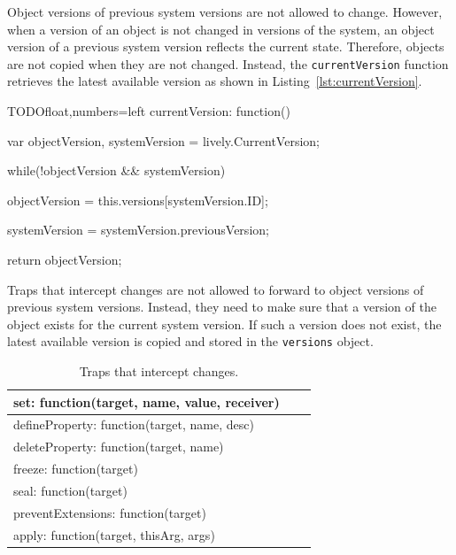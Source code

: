 Object versions of previous system versions are not allowed to change.
However, when a version of an object is not changed in versions of the system, an object version of a previous system version reflects the current state.
Therefore, objects are not copied when they are not changed.
Instead, the \lstinline{currentVersion} function retrieves the latest available version as shown in Listing~\ref{lst:currentVersion}.

\begin{code}{TODO}{float,numbers=left}
currentVersion: function() {
    var objectVersion,
        systemVersion = lively.CurrentVersion;
    
    while(!objectVersion && systemVersion) {
        objectVersion = this.versions[systemVersion.ID];

        systemVersion = systemVersion.previousVersion;
    }
    
    return objectVersion;
}
\end{code}
\iffalse
\end{verbatim}\fi

Traps that intercept changes are not allowed to forward to object versions of previous system versions.
Instead, they need to make sure that a version of the object exists for the current system version.
If such a version does not exist, the latest available version is copied and stored in the \lstinline{versions} object.

\begin{table}[h]
\begin{center}
\begin{tabular}{|l|l|r|}
\hline
set: function(target, name, value, receiver) \\ \hline
defineProperty: function(target, name, desc) \\ \hline
deleteProperty: function(target, name) \\ \hline
freeze: function(target) \\ \hline
seal: function(target) \\ \hline
preventExtensions: function(target) \\ \hline
apply: function(target, thisArg, args) \\ \hline
\end{tabular}
\caption[Table caption text]{Traps that intercept changes.}
\label{table:writeTraps}
\end{center}
\end{table}

